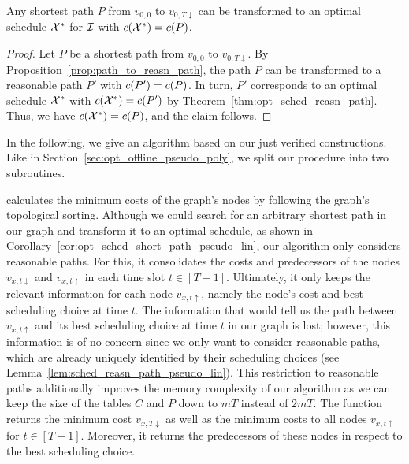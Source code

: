 \begin{cor}\label{cor:opt_sched_short_path_pseudo_lin}
Any shortest path $P$ from $v_{0,0}$ to $v_{0,T\downarrow}$ can be transformed to an optimal schedule $\mathcal{X}^*$ for $\mathcal{I}$ with $c(\mathcal{X}^*)=c(P)$.
\end{cor}
\begin{proof}
Let $P$ be a shortest path from $v_{0,0}$ to $v_{0,T\downarrow}$. By Proposition~\ref{prop:path_to_reasn_path}, the path $P$ can be transformed to a reasonable path $P'$ with $c(P')=c(P)$.
In turn, $P'$ corresponds to an optimal schedule $\mathcal{X}^*$ with $c(\mathcal{X}^*)=c(P')$ by Theorem~\ref{thm:opt_sched_reasn_path}. Thus, we have $c(\mathcal{X}^*)=c(P)$, and the claim follows.
\end{proof}
In the following, we give an algorithm based on our just verified constructions. Like in Section~\ref{sec:opt_offline_pseudo_poly}, we split our procedure into two subroutines.

 calculates the minimum costs of the graph's nodes by following the graph's topological sorting. Although we could search for an arbitrary shortest path in our graph and transform it to an optimal schedule, as shown in Corollary~\ref{cor:opt_sched_short_path_pseudo_lin}, our algorithm only considers reasonable paths. 
For this, it consolidates the costs and predecessors of the nodes $v_{x,t\downarrow}$ and $v_{x,t\uparrow}$ in each time slot $t\in[T-1]$. Ultimately, it only keeps the relevant information for each node $v_{x,t\uparrow}$, namely the node's cost and best scheduling choice at time $t$. The information that would tell us the path between $v_{x,t\uparrow}$ and its best scheduling choice at time $t$ in our graph is lost; however, this information is of no concern since we only want to consider reasonable paths, which are already uniquely identified by their scheduling choices (see Lemma~\ref{lem:sched_reasn_path_pseudo_lin}). This restriction to reasonable paths additionally improves the memory complexity of our algorithm as we can keep the size of the tables $C$ and $P$ down to $mT$ instead of $2mT$. The function returns the minimum cost $v_{x,T\downarrow}$ as well as the minimum costs to all nodes $v_{x,t\uparrow}$ for $t\in[T-1]$. Moreover, it returns the predecessors of these nodes in respect to the best scheduling choice.

